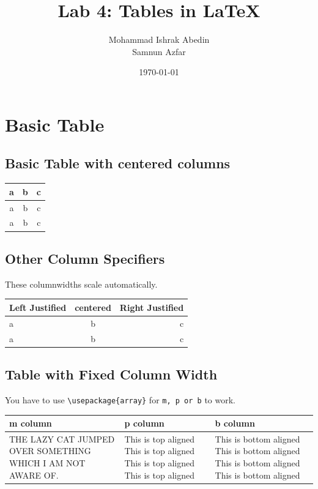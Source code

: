 \documentclass[a4paper,12pt]{article}
\title{Lab 4: Tables in \LaTeX}
\author{Mohammad Ishrak Abedin \\ Samnun Azfar}
\date{\today}
\begin{document}
\begin{titlepage}  
\maketitle
\end{titlepage}

\section{Basic Table}

\subsection{Basic Table with centered columns}
\begin{center}
    \begin{tabular}{ || c | c | c ||}
        a & b & c \\
        \hline
        \hline
        a & b & c\\[1cm] %
        \hline
        a & b & c 
        
    \end{tabular}
\end{center}

\subsection{Other Column Specifiers}
These columnwidths scale automatically.
\begin{center}
    \begin{tabular}{ || l | c | r ||}
        Left Justified & centered & Right Justified \\
        \hline
        \hline
        a & b & c\\[1cm] %
        \hline
        a & b & c 
        
    \end{tabular}
\end{center}

\newpage
\subsection{Table with Fixed Column Width}
You have to use \verb|\usepackage{array}| for \texttt{m, p or b} to work.
\begin{center}
    \begin{tabular}{ || m{.3\linewidth} | p{.3\linewidth} | b{.3\linewidth} ||}
        \hline
        m column & p column & b column \\
        \hline
        THE LAZY CAT JUMPED OVER SOMETHING WHICH I AM NOT AWARE OF. & This is top aligned This is top aligned This is top aligned This is top aligned  & This is bottom aligned This is bottom \newline aligned This is bottom aligned This is bottom aligned  \\
        \hline
    \end{tabular}
\end{center}
\end{document}
